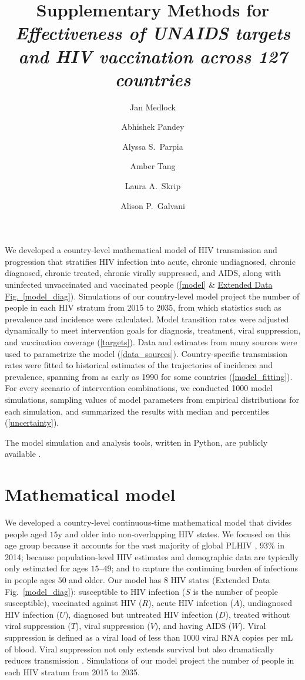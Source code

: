 \documentclass{article}
\title{Supplementary Methods for\\
  \emph{Effectiveness of UNAIDS targets and HIV vaccination across 127
    countries}}
\author{Jan Medlock}
\affil{Department of Biomedical Sciences, Oregon State University, 106
  Dryden Hall, Corvallis, OR, 97331-4801, USA,
  \href{mailto:jan.medlock@oregonstate.edu}
  {\texttt{jan.medlock@oregonstate.edu}}}
\author{Abhishek Pandey} \author{Alyssa S.~Parpia} \author{Amber Tang}
\author{Laura A.~Skrip} \author{Alison P.~Galvani}
\affil{Center for Infectious Disease Modeling and Analysis, Yale
  School of Public Health, 135 College Street, New Haven, USA}
\begin{document}
\maketitle

We developed a country-level mathematical model of HIV transmission
and progression that stratifies HIV infection into acute, chronic
undiagnosed, chronic diagnosed, chronic treated, chronic virally
suppressed, and AIDS, along with uninfected unvaccinated and
vaccinated people (\autoref{model} \&
\hyperref[model_diag]{Extended Data Fig.~\ref*{model_diag}}).
Simulations of our country-level model project the number of people in
each HIV stratum from 2015 to 2035, from which statistics such as
prevalence and incidence were calculated.  Model transition rates were
adjusted dynamically to meet intervention goals for diagnosis,
treatment, viral suppression, and vaccination coverage
(\autoref{targets}).  Data and estimates from many sources were used
to parametrize the model (\autoref{data_sources}).  Country-specific
transmission rates were fitted to historical estimates of the
trajectories of incidence and prevalence, spanning from as early as
1990 for some countries (\autoref{model_fitting}). For every scenario
of intervention combinations, we conducted 1000 model simulations,
sampling values of model parameters from empirical distributions for
each simulation, and summarized the results with median and
percentiles (\autoref{uncertainty}).

The model simulation and analysis tools, written in Python, are
publicly available \autocite{medlock2016-git}.


\section{Mathematical model}
\label{model}

We developed a country-level continuous-time mathematical model that
divides people aged $15$\;y and older into non-overlapping HIV states.
We focused on this age group because it accounts for the vast majority
of global PLHIV \autocite{UNICEF}, 93\% in 2014; because
population-level HIV estimates and demographic data are typically only
estimated for ages $15$--$49$; and to capture the continuing burden of
infections in people ages $50$ and older.  Our model has 8 HIV states
(Extended Data Fig.~\ref*{model_diag}): susceptible to HIV infection
($S$ is the number of people susceptible), vaccinated against HIV
($R$), acute HIV infection ($A$), undiagnosed HIV infection ($U$),
diagnosed but untreated HIV infection ($D$), treated without viral
suppression ($T$), viral suppression ($V$), and having AIDS ($W$).
Viral suppression is defined as a viral load of less than 1000 viral
RNA copies per mL of blood.  Viral suppression not only extends
survival but also dramatically reduces transmission
\autocite{vernazza2000, ioannidis2001, attia2009, May2014-gp}.
Simulations of our model project the number of people in each HIV
stratum from 2015 to 2035.
\end{document}
